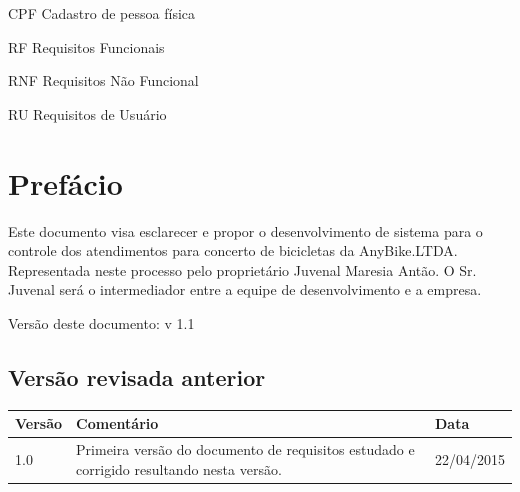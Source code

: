 \documentclass[
	12pt,				%
	openright,
	oneside,			%
	a4paper,			%
	chapter=TITLE,		%
	brazil				%
	]{abntex2}
\begin{document}

\frenchspacing 


\imprimirfolhaderosto

\tableofcontents*
\cleardoublepage


\textual


\listoffigures*
\cleardoublepage

\begin{siglas}
  \item[CPF] Cadastro de pessoa física 
  \item[RF] Requisitos Funcionais
  \item[RNF] Requisitos Não Funcional
  \item[RU] Requisitos de Usuário
  
\end{siglas}



\chapter*{Prefácio}

Este documento visa esclarecer e propor o desenvolvimento de sistema para o controle dos atendimentos para concerto de bicicletas da AnyBike.LTDA. Representada neste processo pelo proprietário Juvenal Maresia Antão. O Sr. Juvenal será o intermediador entre a equipe de desenvolvimento e a empresa. 

Versão deste documento: v 1.1

\section*{Versão revisada anterior}
\begin{flushleft}
	\begin{tabular}{| p{3cm} | p{9cm} | p{3cm} |}
 	   \hline
	    \textbf{Versão} 		& \textbf{Comentário} 				& \textbf{Data}  \\ \hline
	    1.0		 				& Primeira versão do documento de %
	    						requisitos estudado e corrigido %
	    						resultando nesta versão. 			& 22/04/2015 		 \\ \hline 	   
	\end{tabular}
\end{flushleft}
\end{document}
